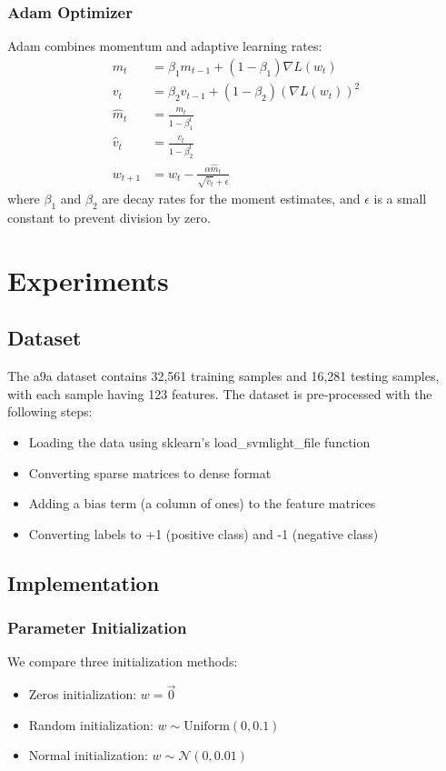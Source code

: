 \documentclass[journal, a4paper]{IEEEtran}
\begin{document}
\subsubsection{Adam Optimizer}
Adam combines momentum and adaptive learning rates:
\begin{align}
m_t &= \beta_1 m_{t-1} + (1-\beta_1) \nabla L(w_t) \\
v_t &= \beta_2 v_{t-1} + (1-\beta_2) (\nabla L(w_t))^2 \\
\hat{m}_t &= \frac{m_t}{1-\beta_1^t} \\
\hat{v}_t &= \frac{v_t}{1-\beta_2^t} \\
w_{t+1} &= w_t - \frac{\alpha \hat{m}_t}{\sqrt{\hat{v}_t} + \epsilon}
\end{align}
where $\beta_1$ and $\beta_2$ are decay rates for the moment estimates, and $\epsilon$ is a small constant to prevent division by zero.

\section{Experiments}
\subsection{Dataset}
The a9a dataset contains 32,561 training samples and 16,281 testing samples, with each sample having 123 features. The dataset is pre-processed with the following steps:

\begin{itemize}
    \item Loading the data using sklearn's load\_svmlight\_file function
    \item Converting sparse matrices to dense format
    \item Adding a bias term (a column of ones) to the feature matrices
    \item Converting labels to +1 (positive class) and -1 (negative class)
\end{itemize}

\subsection{Implementation}
\subsubsection{Parameter Initialization}
We compare three initialization methods:
\begin{itemize}
    \item Zeros initialization: $w = \vec{0}$
    \item Random initialization: $w \sim \text{Uniform}(0, 0.1)$
    \item Normal initialization: $w \sim \mathcal{N}(0, 0.01)$
\end{itemize}
\end{document}
